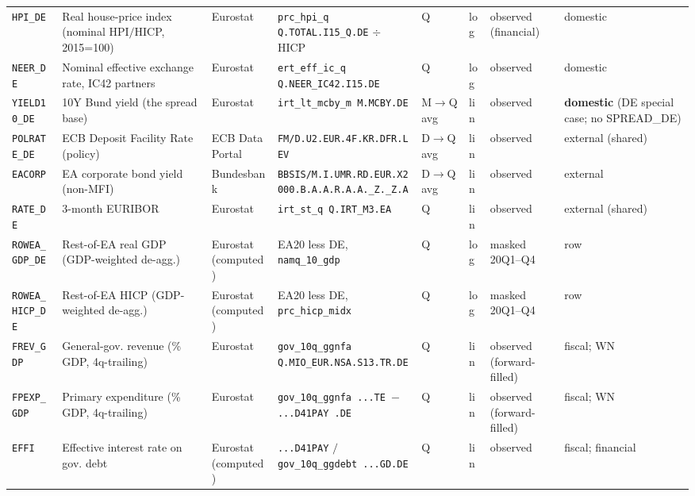 \begin{longtable}{@{}p{}p{}p{}p{}p{}p{}p{}p{}@{}}
\texttt{HPI\_DE}    & Real house-price index (nominal HPI$/$HICP, 2015=100) & Eurostat & \texttt{prc\_hpi\_q Q.\allowbreak TOTAL.\allowbreak I15\_Q.\allowbreak DE} $\div$ HICP & Q & log & observed (financial) & domestic \\
\texttt{NEER\_DE}   & Nominal effective exchange rate, IC42 partners & Eurostat & \texttt{ert\_eff\_ic\_q Q.\allowbreak NEER\_IC42.\allowbreak I15.\allowbreak DE} & Q & log & observed & domestic \\
\texttt{YIELD10\_DE}& 10Y Bund yield (the spread base) & Eurostat & \texttt{irt\_lt\_mcby\_m M.\allowbreak MCBY.\allowbreak DE} & M$\to$Q avg & lin & observed & \textbf{domestic} (DE special case; no SPREAD\_DE) \\
\texttt{POLRATE\_DE}& ECB Deposit Facility Rate (policy) & ECB Data Portal & \texttt{FM/D.\allowbreak U2.\allowbreak EUR.4F.\allowbreak KR.\allowbreak DFR.\allowbreak LEV} & D$\to$Q avg & lin & observed & external (shared) \\
\texttt{EACORP}     & EA corporate bond yield (non-MFI) & Bundesbank & \texttt{BBSIS/\allowbreak M.\allowbreak I.\allowbreak UMR.\allowbreak RD.\allowbreak EUR.\allowbreak X2000.\allowbreak B.A.A.\allowbreak R.A.A.\allowbreak \_Z.\_Z.A} & D$\to$Q avg & lin & observed & external \\
\texttt{RATE\_DE}   & 3-month EURIBOR & Eurostat & \texttt{irt\_st\_q Q.\allowbreak IRT\_M3.\allowbreak EA} & Q & lin & observed & external (shared) \\
\texttt{ROWEA\_GDP\_DE}  & Rest-of-EA real GDP (GDP-weighted de-agg.) & Eurostat (computed) & EA20 less DE, \texttt{namq\_10\_gdp} & Q & log & masked 20Q1--Q4 & row \\
\texttt{ROWEA\_HICP\_DE} & Rest-of-EA HICP (GDP-weighted de-agg.) & Eurostat (computed) & EA20 less DE, \texttt{prc\_hicp\_midx} & Q & log & masked 20Q1--Q4 & row \\
\texttt{FREV\_GDP}  & General-gov. revenue (\% GDP, 4q-trailing) & Eurostat & \texttt{gov\_10q\_ggnfa Q.\allowbreak MIO\_EUR.\allowbreak NSA.\allowbreak S13.\allowbreak TR.\allowbreak DE} & Q & lin & observed (forward-filled) & fiscal; WN \\
\texttt{FPEXP\_GDP} & Primary expenditure (\% GDP, 4q-trailing) & Eurostat & \texttt{gov\_10q\_ggnfa ...\allowbreak TE $-$ ...\allowbreak D41PAY .\allowbreak DE} & Q & lin & observed (forward-filled) & fiscal; WN \\
\texttt{EFFI}       & Effective interest rate on gov. debt & Eurostat (computed) & \texttt{...D41PAY} $/$ \texttt{gov\_10q\_ggdebt ...\allowbreak GD.\allowbreak DE} & Q & lin & observed & fiscal; financial \\

\end{longtable}
